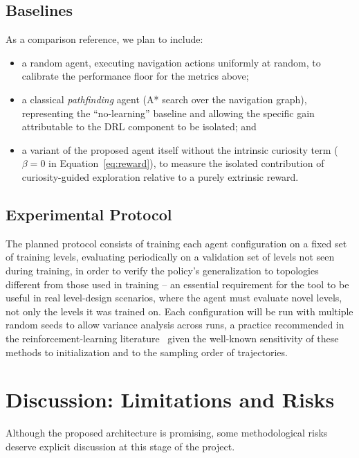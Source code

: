 \documentclass[sigconf,nonacm,language=english]{acmart}
\begin{document}
\subsection{Baselines}

As a comparison reference, we plan to include:
\begin{itemize}
  \item a random agent, executing navigation actions uniformly at random,
    to calibrate the performance floor for the metrics above;
  \item a classical \emph{pathfinding} agent (A* search over the navigation
    graph), representing the ``no-learning'' baseline and allowing the
    specific gain attributable to the DRL component to be isolated; and
  \item a variant of the proposed agent itself without the intrinsic
    curiosity term ($\beta = 0$ in Equation~\eqref{eq:reward}), to measure
    the isolated contribution of curiosity-guided exploration relative to
    a purely extrinsic reward.
\end{itemize}

\subsection{Experimental Protocol}

The planned protocol consists of training each agent configuration on a
fixed set of training levels, evaluating periodically on a validation set
of levels not seen during training, in order to verify the policy's
generalization to topologies different from those used in training -- an
essential requirement for the tool to be useful in real level-design
scenarios, where the agent must evaluate novel levels, not only the levels
it was trained on. Each configuration will be run with multiple random
seeds to allow variance analysis across runs, a practice recommended in
the reinforcement-learning literature~\cite{sutton2018reinforcement} given
the well-known sensitivity of these methods to initialization and to the
sampling order of trajectories.

\section{Discussion: Limitations and Risks}
\label{sec:discussao}

Although the proposed architecture is promising, some methodological risks
deserve explicit discussion at this stage of the project.
\end{document}
